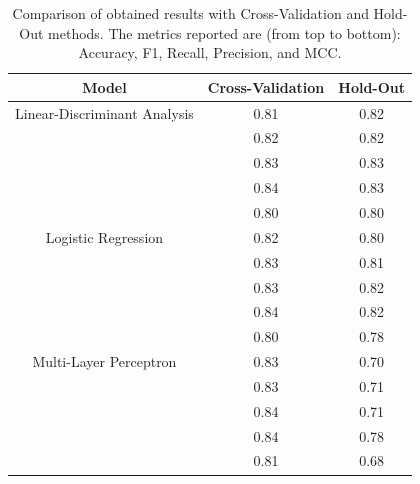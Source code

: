             \begin{table}[htbp]
                \centering
                \begin{tabular}{|c|c|c|}
                \hline
                \textbf{Model} & \textbf{Cross-Validation} & \textbf{Hold-Out} \\ \hline
                    Linear-Discriminant Analysis    & 0.81 & 0.82 \\ 
                                                    & 0.82 & 0.82 \\ 
                                                    & 0.83 & 0.83 \\ 
                                                    & 0.84 & 0.83 \\
                                                    & 0.80 & 0.80 \\ 
                                                    \hline
                    Logistic Regression             & 0.82 & 0.80 \\ 
                                                    & 0.83 & 0.81 \\ 
                                                    & 0.83 & 0.82 \\ 
                                                    & 0.84 & 0.82 \\
                                                    & 0.80 & 0.78 \\
                                                    \hline
                    Multi-Layer Perceptron          & 0.83 & 0.70 \\ 
                                                    & 0.83 & 0.71 \\ 
                                                    & 0.84 & 0.71 \\
                                                    & 0.84 & 0.78 \\ 
                                                    & 0.81 & 0.68 \\ 
                                                    \hline
                \end{tabular}
                \caption{Comparison of obtained results with Cross-Validation and Hold-Out methods. The metrics reported are (from top to bottom): Accuracy, F1, Recall, Precision, and MCC.}
                \label{tab:feature_engineering_approach_holdout}
            \end{table}

